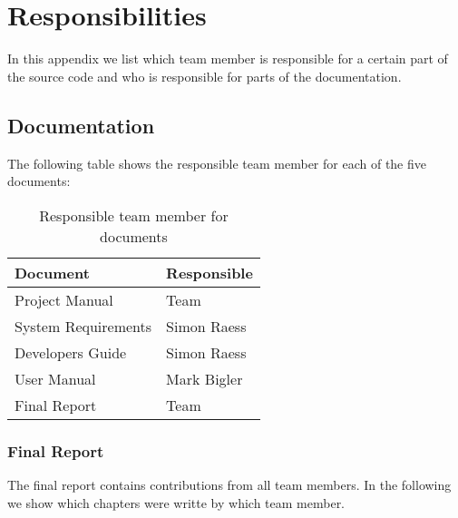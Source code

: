 \chapter{Responsibilities}
\label{chapter:responsibilities}

In this appendix we list which team member is responsible for a certain part
of the source code and who is responsible for parts of the documentation.



\section{Documentation}
The following table shows the responsible team member for each of the
five documents:
\begin{table}[H]
 \centering
 \begin{tabular}{|l|l|}
  \hline
   \multicolumn{1}{|p{2.0in}|}{\bfseries{\textsf{Document}}} &
   \multicolumn{1}{|p{1.0in}|}{\bfseries{\textsf{Responsible}}} \\
  \hline
   \multicolumn{1}{|p{2.0in}|}{Project Manual} &
   \multicolumn{1}{|p{1.0in}|}{Team} \\
  \hline
   \multicolumn{1}{|p{2.0in}|}{System Requirements} &
   \multicolumn{1}{|p{1.0in}|}{Simon Raess} \\
  \hline
   \multicolumn{1}{|p{2.0in}|}{Developers Guide} &
   \multicolumn{1}{|p{1.0in}|}{Simon Raess} \\
  \hline
   \multicolumn{1}{|p{2.0in}|}{User Manual} &
   \multicolumn{1}{|p{1.0in}|}{Mark Bigler} \\
  \hline
   \multicolumn{1}{|p{2.0in}|}{Final Report} &
   \multicolumn{1}{|p{1.0in}|}{Team} \\
  \hline
 \end{tabular}
 \caption{Responsible team member for documents}
\end{table}


\subsection{Final Report}
The final report contains contributions from all team members. In the following
we show which chapters were writte by which team member.

